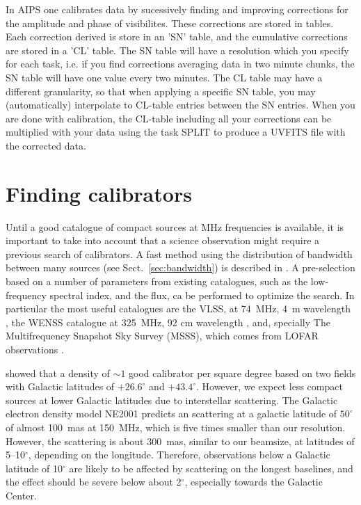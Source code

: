 \documentclass[graybox]{svmult}
\begin{document}
In AIPS one calibrates data by sucessively finding and improving corrections
for the amplitude and phase of visibilites. These corrections are stored in
tables.  Each correction derived is store in an 'SN' table, and the cumulative
corrections are stored in a 'CL' table. The SN table will have a resolution
which you specify for each task, i.e. if you find corrections averaging data in
two minute chunks, the SN table will have one value every two minutes. The CL
table may have a different granularity, so that when applying a specific SN
table, you may (automatically) interpolate to CL-table entries between the SN
entries. When you are done with calibration, the CL-table including all your
corrections can be multiplied with your data using the task SPLIT to produce a
UVFITS file with the corrected data.

\section{Finding calibrators}

Until a good catalogue of compact sources at MHz frequencies is available, it
is important to take into account that a science observation might require a
previous search of calibrators. A fast method using the distribution of
bandwidth between many sources (see Sect.~\ref{sec:bandwidth}) is described in
\cite{moldon14}. A pre-selection based on a number of parameters from existing
catalogues, such as the low-frequency spectral index, and the flux, ca be
performed to optimize the search. In particular the most useful catalogues are
the VLSS, at 74~MHz, 4~m wavelength \citep{lane12a}, the WENSS catalogue at
325~MHz, 92 cm wavelength \citep{rengelink97}, and, specially The
Multifrequency Snapshot Sky Survey (MSSS), which comes from LOFAR observations
\citep{heald14}. 

\cite{moldon14} showed that a density of $\sim1$ good calibrator per square
degree based on two fields with Galactic latitudes of $+26.6^{\circ}$ and
$+43.4^{\circ} $. However, we expect less compact sources at lower Galactic
latitudes due to interstellar scattering. The Galactic electron density model
NE2001 \citep{cordes02} predicts an scattering at a galactic latitude of
$50^{\circ}$ of almost 100~mas at 150~MHz, which is five times smaller than our
resolution. However, the scattering is about 300~mas, similar to our beamsize,
at latitudes of 5--10$^{\circ}$, depending on the longitude. Therefore,
observations below a Galactic latitude of 10$^{\circ}$ are likely to be
affected by scattering on the longest baselines, and the effect should be
severe below about 2$^{\circ}$, especially towards the Galactic Center. 
\end{document}
